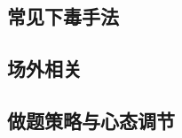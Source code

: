 \documentclass[a4paper]{article}
\begin{document}
\begin{multicols}{2}
				\subsection{常见下毒手法}
					

				\subsection{场外相关}
					

				\subsection{做题策略与心态调节}
					

	\end{multicols}
\end{document}
